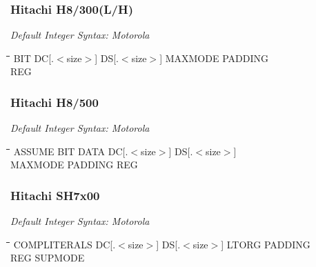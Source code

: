 \subsubsection{Hitachi H8/300(L/H)}

{\em Default Integer Syntax: Motorola}

{\tt\begin{tabbing}
\hspace{3cm}\=\hspace{3cm}\=\hspace{3cm}\=\hspace{3cm}\=\kill
BIT    \> DC[.$<$size$>$] \> DS[.$<$size$>$] \> MAXMODE     \> PADDING \\
REG    \\
\end{tabbing}}

\subsubsection{Hitachi H8/500}

{\em Default Integer Syntax: Motorola}

{\tt\begin{tabbing}
\hspace{3cm}\=\hspace{3cm}\=\hspace{3cm}\=\hspace{3cm}\=\kill
ASSUME          \> BIT    \> DATA   \> DC[.$<$size$>$] \> DS[.$<$size$>$] \\
MAXMODE         \> PADDING         \> REG \\
\end{tabbing}}

\subsubsection{Hitachi SH7x00}

{\em Default Integer Syntax: Motorola}

{\tt\begin{tabbing}
\hspace{3cm}\=\hspace{3cm}\=\hspace{3cm}\=\hspace{3cm}\=\kill
COMPLITERALS \> DC[.$<$size$>$]  \>  DS[.$<$size$>$]  \>  LTORG    \> PADDING \\
REG          \> SUPMODE \\
\end{tabbing}}

